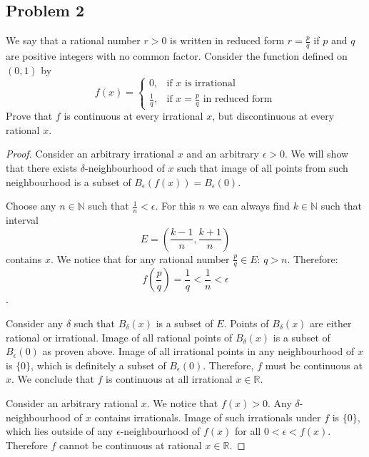 \documentclass{article}
\begin{document}
\subsection*{Problem 2}

\begin{tcolorbox}
We say that a rational number $r > 0$ is written in reduced form $r = \frac{p}{q}$ if $p$ and $q$ are positive integers with no common factor. Consider the function defined on $(0, 1)$ by
$$ f(x) =
\begin{cases}
    0, & \text{if $x$ is irrational}\\
    \frac{1}{q}, & \text{if $x=\frac{p}{q}$ in reduced form}
\end{cases}
$$
Prove that $f$ is continuous at every irrational $x$, but discontinuous at every rational $x$.
\end{tcolorbox}

\begin{proof}
Consider an arbitrary irrational $x$ and an arbitrary $\epsilon>0$. We will show that there exists $\delta$-neighbourhood of $x$ such that image of all points from such neighbourhood is a subset of $B_{\epsilon}(f(x)) = B_{\epsilon}(0)$.

Choose any $n \in \mathbb{N}$ such that $\frac{1}{n} < \epsilon$. For this $n$ we can always find $k \in \mathbb{N}$ such that interval
$$ E = \left( \frac{k-1}{n}, \frac{k+1}{n} \right) $$
contains $x$. We notice that for any rational number $\frac{p}{q} \in E$: $q > n $. Therefore:
$$ f \left( \frac{p}{q} \right) = \frac{1}{q} < \frac{1}{n} < \epsilon $$.

Consider any $\delta$ such that $B_{\delta}(x)$ is a subset of $E$. Points of $B_{\delta}(x)$ are either rational or irrational. Image of all rational points of $B_{\delta}(x)$ is a subset of $B_{\epsilon}(0)$ as proven above. Image of all irrational points in any neighbourhood of $x$ is $\{0\}$, which is definitely a subset of $B_{\epsilon}(0)$. Therefore, $f$ must be continuous at $x$. We conclude that $f$ is continuous at all irrational $x \in \mathbb{R}$.

Consider an arbitrary rational $x$. We notice that $f(x)>0$. Any $\delta$-neighbourhood of $x$ contains irrationals. Image of such irrationals under $f$ is $\{0\}$, which lies outside of any $\epsilon$-neighbourhood of $f(x)$ for all $0 < \epsilon < f(x)$. Therefore $f$ cannot be continuous at rational $x \in \mathbb{R}$.

\end{proof}
\end{document}
